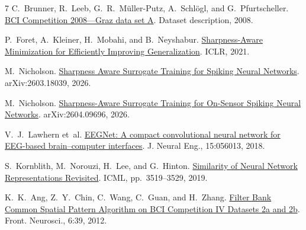 \documentclass[11pt,a4paper]{article}
\begin{document}
\begin{thebibliography}{7}
\setlength{\itemsep}{0pt}
\setlength{\parskip}{0pt}
C.~Brunner, R.~Leeb, G.~R.~M\"uller-Putz, A.~Schl\"ogl, and G.~Pfurtscheller.
\href{https://www.bbci.de/competition/iv/desc_2a.pdf}{BCI Competition 2008---Graz
data set A}. Dataset description, 2008.

P.~Foret, A.~Kleiner, H.~Mobahi, and B.~Neyshabur.
\href{https://arxiv.org/abs/2010.01412}{Sharpness-Aware Minimization for
Efficiently Improving Generalization}. ICLR, 2021.

M.~Nicholson. \href{https://arxiv.org/abs/2603.18039}{Sharpness Aware Surrogate
Training for Spiking Neural Networks}. arXiv:2603.18039, 2026.

M.~Nicholson. \href{https://arxiv.org/abs/2604.09696}{Sharpness-Aware
Surrogate Training for On-Sensor Spiking Neural Networks}.
arXiv:2604.09696, 2026.

V.~J.~Lawhern et~al.
\href{https://doi.org/10.1088/1741-2552/aace8c}{EEGNet: A compact convolutional
neural network for EEG-based brain--computer interfaces}.
J. Neural Eng., 15:056013, 2018.

S.~Kornblith, M.~Norouzi, H.~Lee, and G.~Hinton.
\href{https://proceedings.mlr.press/v97/kornblith19a.html}{Similarity of Neural
Network Representations Revisited}. ICML, pp.~3519--3529, 2019.

K.~K.~Ang, Z.~Y.~Chin, C.~Wang, C.~Guan, and H.~Zhang.
\href{https://doi.org/10.3389/fnins.2012.00039}{Filter Bank Common Spatial Pattern
Algorithm on BCI Competition IV Datasets 2a and 2b}. Front. Neurosci., 6:39, 2012.
\end{thebibliography}
\end{document}
